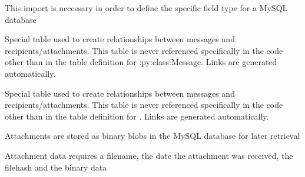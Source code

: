 \documentclass[letterpaper,10pt,english]{sphinxmanual}
\begin{document}
This import is necessary in order to define the specific field type for a MySQL database

\begin{fulllineitems}
\label{codedocs/database:database.SQLAlchemy.mr_link}
Special table used to create relationships between messages and recipients/attachments.
This table is never referenced specifically in the code other than in the table definition for :py:class:Message.
Links are generated automatically.

\end{fulllineitems}


\begin{fulllineitems}
\label{codedocs/database:database.SQLAlchemy.ma_link}
Special table used to create relationships between messages and recipients/attachments.
This table is never referenced specifically in the code other than in the table definition for .
Links are generated automatically.

\end{fulllineitems}


\begin{fulllineitems}
\label{codedocs/database:database.SQLAlchemy.Attachment}
Attachments are stored as binary blobs in the MySQL database for later retrieval

\begin{fulllineitems}
\label{codedocs/database:database.SQLAlchemy.Attachment.__init__}
Attachment data requires a filename, the date the attachment was received, the filehash and the binary data

\end{fulllineitems}


\end{fulllineitems}
\end{document}
